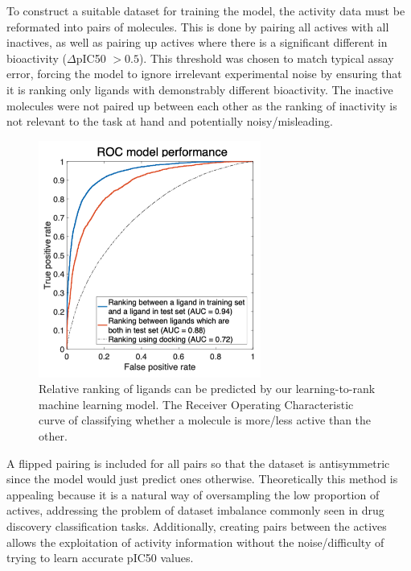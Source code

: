 To construct a suitable dataset for training the model, the activity data must be reformated into pairs of molecules. This is done by pairing all actives with all inactives, as well as pairing up actives where there is a significant different in bioactivity ($\Delta$pIC50 $>0.5$). This threshold was chosen to match typical assay error, forcing the model to ignore irrelevant experimental noise by ensuring that it is ranking only ligands with demonstrably different bioactivity. The inactive molecules were not paired up between each other as the ranking of inactivity is not relevant to the task at hand and potentially noisy/misleading.

\begin{figure}[!th]
    \centering
    \includegraphics[width=0.65\textwidth]{Chapters/Ranking/Figs/roc_curve.png}
    \caption{Relative ranking of ligands can be predicted by our learning-to-rank machine learning model. The Receiver Operating Characteristic curve of classifying whether a molecule is more/less active than the other.}
    \label{fig:roc_plot}
\end{figure}

A flipped pairing is included for all pairs so that the dataset is antisymmetric since the model would just predict ones otherwise. Theoretically this method is appealing because it is a natural way of oversampling the low proportion of actives, addressing the problem of dataset imbalance commonly seen in drug discovery classification tasks. Additionally, creating pairs between the actives allows the exploitation of activity information without the noise/difficulty of trying to learn accurate pIC50 values.


